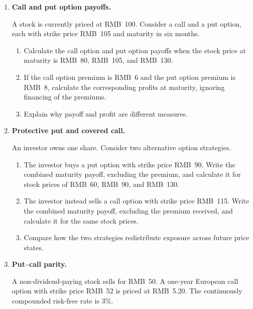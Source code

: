 \begin{enumerate}

\item \textbf{Call and put option payoffs.}

A stock is currently priced at RMB~100. Consider a call and a put option, each with strike price RMB~105 and maturity in six months.

\begin{enumerate}

\item Calculate the call option and put option payoffs when the stock price at maturity is RMB~80, RMB~105, and RMB~130.

\item If the call option premium is RMB~6 and the put option premium is RMB~8, calculate the corresponding profits at maturity, ignoring financing of the premiums.

\item Explain why payoff and profit are different measures.

\end{enumerate}

\item \textbf{Protective put and covered call.}

An investor owns one share. Consider two alternative option strategies.

\begin{enumerate}

\item The investor buys a put option with strike price RMB~90. Write the combined maturity payoff, excluding the premium, and calculate it for stock prices of RMB~60, RMB~90, and RMB~130.

\item The investor instead sells a call option with strike price RMB~115. Write the combined maturity payoff, excluding the premium received, and calculate it for the same stock prices.

\item Compare how the two strategies redistribute exposure across future price states.

\end{enumerate}

\item \textbf{Put--call parity.}

A non-dividend-paying stock sells for RMB~50. A one-year European call option with strike price RMB~52 is priced at RMB~5.20. The continuously compounded risk-free rate is 3\%.


\end{enumerate}
